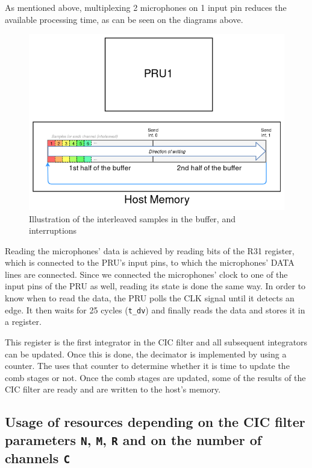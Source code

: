 \documentclass[]{report}
\begin{document}
As mentioned above, multiplexing 2 microphones on 1 input pin reduces
the available processing time, as can be seen on the diagrams above.

\begin{figure}
\centering
\includegraphics[width=0.8\linewidth]{Pictures/PRU_buffer.png}
\caption{Illustration of the interleaved samples in the buffer, and
interruptions}
\end{figure}

Reading the microphones' data is achieved by reading bits of the R31
register, which is connected to the PRU's input pins, to which the
microphones' DATA lines are connected. Since we connected the
microphones' clock to one of the input pins of the PRU as well, reading
its state is done the same way. In order to know when to read the data,
the PRU polls the CLK signal until it detects an edge. It then waits for
25 cycles (\texttt{t\_dv}) and finally reads the data and stores it in a
register.

This register is the first integrator in the CIC filter and all
subsequent integrators can be updated. Once this is done, the decimator
is implemented by using a counter. The uses that counter to determine
whether it is time to update the comb stages or not. Once the comb
stages are updated, some of the results of the CIC filter are ready and
are written to the host's memory.

\hypertarget{usage-of-resources-depending-on-the-cic-filter-parameters-n-m-r-and-on-the-number-of-channels-c}{%
\subsection{\texorpdfstring{Usage of resources depending on the CIC
filter parameters \texttt{N}, \texttt{M}, \texttt{R} and on the number
of channels
\texttt{C}}{Usage of resources depending on the CIC filter parameters N, M, R and on the number of channels C}}\label{usage-of-resources-depending-on-the-cic-filter-parameters-n-m-r-and-on-the-number-of-channels-c}}
\end{document}
